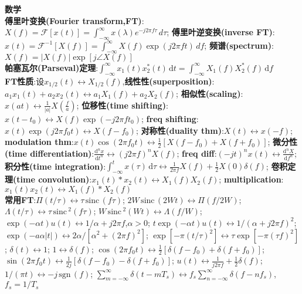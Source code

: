 \documentclass[UTF8,a4paper,10pt]{article}
\providecommand{\abs}[1]{\left\lvert#1\right\rvert}
\providecommand{\sgn}{\,\mathrm{sgn}\,}
\providecommand{\sinc}{\,\mathrm{sinc}\,}
\begin{document}
\begin{multicols*}{2}
\textbf{数学}\hrulefill\\
\textbf{傅里叶变换(Fourier transform,FT)}:$X(f)=\mathscr{F}[x(t)]=\int_{-\infty}^{\infty}x(\lambda)e^{-j2\pi f\tau}\,d\tau$;%
    \textbf{傅里叶逆变换(inverse FT)}:$x(t)=\mathscr{F}^{-1}[X(f)]=\int_{-\infty}^{\infty}X(f)\exp(j2\pi ft)\,df$;%
    \textbf{频谱(spectrum)}:$X(f)=\abs{X(f)}\exp[j\angle X(f)]$\\
\textbf{帕塞瓦尔(Parseval)定理}:$\int_{-\infty}^{\infty}x_1(t)x_2^*(t)\,\mathrm{d}t=\int_{-\infty}^{\infty}X_1(f)X_2^*(f)\,\mathrm{d}f$\\
\textbf{FT性质}:设$x_{1/2}(t)\leftrightarrow X_{1/2}(f)$,\textbf{线性性(superposition)}:$a_1x_1(t)+a_2x_2(t)\leftrightarrow a_1X_1(f)+a_2X_2(f)$;%
    \textbf{相似性(scaling)}:$x(at)\leftrightarrow\frac{1}{\abs{a}}X(\frac{f}{a})$;%
    \textbf{位移性(time shifting)}:$x(t-t_0)\leftrightarrow X(f)\exp(-j2\pi ft_0)$;%
    \textbf{freq shifting}:$x(t)\exp(j2\pi f_0t)\leftrightarrow X(f-f_0)$;%
    \textbf{对称性(duality thm)}:$X(t)\leftrightarrow x(-f)$;%
    \textbf{modulation thm}:$x(t)\cos(2\pi f_0t)\leftrightarrow \frac{1}{2}[X(f-f_0)+X(f+f_0)]$;%
    \textbf{微分性(time differentiation)}:$\frac{\mathrm{d}^nx}{\mathrm{d}t^n}\leftrightarrow(j2\pi f)^nX(f)$;%
    \textbf{freq diff}:$(-jt)^nx(t)\leftrightarrow\frac{\mathrm{d}^nX}{\mathrm{d}f^n}$;%
    \textbf{积分性(time integration)}:$\int_{-\infty}^tx(\tau)\,\mathrm{d}\tau\leftrightarrow\frac{1}{2\pi f}X(f)+\frac{1}{2}X(0)\delta(f)$;%
    \textbf{卷积定理(time convolution)}:$x_1(t)*x_2(t)\leftrightarrow X_1(f)X_2(f)$;%
    \textbf{multiplication}:$x_1(t)x_2(t)\leftrightarrow X_1(f)*X_2(f)$\\
\textbf{常用FT}:$\Pi(t/\tau)\leftrightarrow\tau\sinc(f\tau)$;%
    $2W\sinc(2Wt)\leftrightarrow\Pi(f/2W)$;%
    $\Lambda(t/\tau)\leftrightarrow\tau\sinc^2(f\tau)$;%
    $W\sinc^2(Wt)\leftrightarrow\Lambda(f/W)$;%
    $\exp(-\alpha t)u(t)\leftrightarrow 1/\alpha+j2\pi f$,$\alpha>0$;%
    $t\exp(-\alpha t)u(t)\leftrightarrow 1/(\alpha+j2\pi f)^2$;%
    $\exp(-a\alpha\abs{t})\leftrightarrow 2\alpha/[\alpha^2+(2\pi f)^2]$;%
    $\exp[-\pi(t/\tau)^2]\leftrightarrow\tau\exp[-\pi(\tau f)^2]$;%
    $\delta(t)\leftrightarrow 1$;%
    $1\leftrightarrow\delta(f)$;%
    $\cos(2\pi f_0t)\leftrightarrow\frac{1}{2}[\delta(f-f_0)+\delta(f+f_0)]$;%
    $\sin(2\pi f_0t)\leftrightarrow\frac{1}{2j}[\delta(f-f_0)-\delta(f+f_0)]$;%
    $u(t)\leftrightarrow\frac{1}{j2\pi f}+\frac{1}{2}\delta(f)$;%
    $1/(\pi t)\leftrightarrow-j\sgn(f)$;%
    $\sum_{m=-\infty}^{\infty}\delta(t-mT_s)\leftrightarrow f_s\sum_{n=-\infty}^{\infty}\delta(f-nf_s)$,$f_s=1/T_s$
\end{multicols*}
\end{document}
